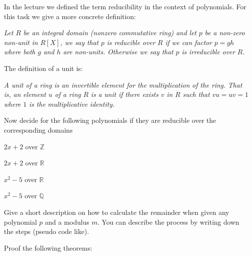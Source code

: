 \begin{aufgabe}[Reducibility]
In the lecture we defined the term reducibility in the context of polynomials.
For this task we give a more concrete definition:

\emph{Let $R$ be an integral domain (nonzero commutative ring) and let $p$ be a non-zero non-unit in $R[X]$, we say that $p$ is reducible over $R$ if we can factor $p = gh$ where both $g$ and $h$ are non-units.
Otherwise we say that $p$ is irreducible over $R$.}

The definition of a unit is:

\emph{A unit of a ring is an invertible element for the multiplication of the ring. That is, an element $u$ of a ring $R$ is a unit if there exists $v$ in $R$ such that 
$v u = u v = 1$ 
where $1$ is the multiplicative identity.}

Now decide for the following polynomials if they are reducible over the corresponding domains


\begin{teilaufgabe}
\item $2x+2$ over $\mathbb{Z}$
    
\end{teilaufgabe}

\begin{teilaufgabe}
\item $2x+2$ over $\mathbb{R}$
    
\end{teilaufgabe}

\begin{teilaufgabe}
\item  $x^2-5$ over $\mathbb{R}$
    
\end{teilaufgabe}

\begin{teilaufgabe}
\item  $x^2-5$ over $\mathbb{Q}$
    
\end{teilaufgabe}



\begin{aufgabe}
Give a short description on how to calculate the remainder when given any polynomial $p$ and a modulus $m$.
You can describe the process by writing down the steps (pseudo code like).
\end{aufgabe}



\begin{aufgabe}
Proof the following theorems:


\end{aufgabe}
\end{aufgabe}
